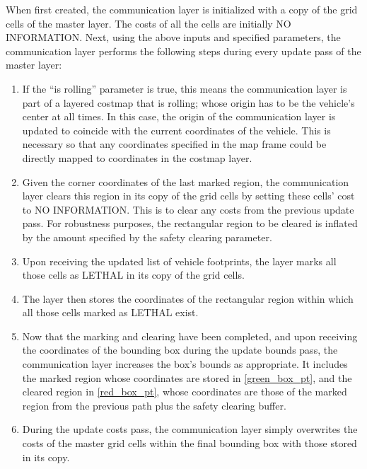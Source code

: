 \begin{enumerate}
    When first created, the communication layer is initialized with a copy of the grid cells of the master layer. The costs of all the cells are initially NO INFORMATION. Next, using the above inputs and specified parameters, the communication layer performs the following steps during every update pass of the master layer:

    \begin{enumerate}
        \item If the “is rolling” parameter is true, this means the communication layer is part of a layered costmap that is rolling; whose origin has to be the vehicle’s center at all times. In this case, the origin of the communication layer is updated to coincide with the current coordinates of the vehicle. This is necessary so that any coordinates specified in the map frame could be directly mapped to coordinates in the costmap layer.
        \item Given the corner coordinates of the last marked region, the communication layer clears this region in its copy of the grid cells by setting these cells’ cost to NO INFORMATION. This is to clear any costs from the previous update pass. For robustness purposes, the rectangular region to be cleared is inflated by the amount specified by the safety clearing parameter.
        \label{red_box_pt}
        \item Upon receiving the updated list of vehicle footprints, the layer marks all those cells as LETHAL in its copy of the grid cells.
        \label{mark_pt}
        \item The layer then stores the coordinates of the rectangular region within which all those cells marked as LETHAL exist.
        \label{green_box_pt}
        \item Now that the marking and clearing have been completed, and upon receiving the coordinates of the bounding box during the update bounds pass, the communication layer increases the box’s bounds as appropriate. It includes the marked region whose coordinates are stored in \ref{green_box_pt}, and the cleared region in \ref{red_box_pt}, whose coordinates are those of the marked region from the previous path plus the safety clearing buffer.
        \label{yellow_box_pt}
        \item During the update costs pass, the communication layer simply overwrites the costs of the master grid cells within the final bounding box with those stored in its copy.
    \end{enumerate}
    

\end{enumerate}
